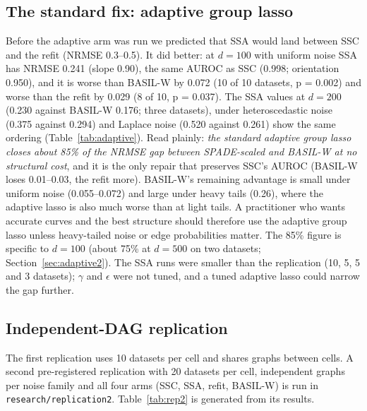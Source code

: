 \documentclass[11pt,a4paper]{article}
\begin{document}
\subsection{The standard fix: adaptive group lasso}
\label{sec:adaptive}

\begin{table}[t]
\centering
\caption{Adaptive group lasso arm (SSA) on the replication seeds, with SSC, refit and BASIL-W taken from the replication runs on the same seeds.}
\label{tab:adaptive}

\end{table}

Before the adaptive arm was run we predicted that SSA would land between SSC and the refit (NRMSE 0.3--0.5). It did better: at $d=100$ with uniform noise SSA has NRMSE 0.241 (slope 0.90), the same AUROC as SSC (0.998; orientation 0.950), and it is worse than BASIL-W by 0.072 (10 of 10 datasets, p = 0.002) and worse than the refit by 0.029 (8 of 10, p = 0.037). The SSA values at $d=200$ (0.230 against BASIL-W 0.176; three datasets), under heteroscedastic noise (0.375 against 0.294) and Laplace noise (0.520 against 0.261) show the same ordering (Table~\ref{tab:adaptive}). Read plainly: \emph{the standard adaptive group lasso closes about 85\% of the NRMSE gap between SPADE-scaled and BASIL-W at no structural cost}, and it is the only repair that preserves SSC's AUROC (BASIL-W loses 0.01--0.03, the refit more). BASIL-W's remaining advantage is small under uniform noise (0.055--0.072) and large under heavy tails (0.26), where the adaptive lasso is also much worse than at light tails. A practitioner who wants accurate curves and the best structure should therefore use the adaptive group lasso unless heavy-tailed noise or edge probabilities matter. The 85\% figure is specific to $d=100$ (about 75\% at $d=500$ on two datasets; Section~\ref{sec:adaptive2}). The SSA runs were smaller than the replication (10, 5, 5 and 3 datasets); $\gamma$ and $\epsilon$ were not tuned, and a tuned adaptive lasso could narrow the gap further.

\subsection{Independent-DAG replication}
\label{sec:rep2}

The first replication uses 10 datasets per cell and shares graphs between cells. A second pre-registered replication with 20 datasets per cell, independent graphs per noise family and all four arms (SSC, SSA, refit, BASIL-W) is run in \texttt{research/replication2}. Table~\ref{tab:rep2} is generated from its results.
\end{document}
